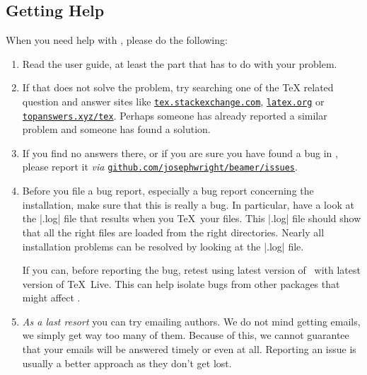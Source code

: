 \endgroup


\subsection{Getting Help}

When you need help with \beamer, please do the following:
\begin{enumerate}
\item
  Read the user guide, at least the part that has to do with your problem.
\item
  If that does not solve the problem, try searching one of the \TeX{} related question and answer sites like \href{https://tex.stackexchange.com}{\texttt{tex.stackexchange.com}}, \href{https://latex.org/forum/}{\texttt{latex.org}} or \href{https://topanswers.xyz/tex}{\texttt{topanswers.xyz/tex}}.
  Perhaps someone has already reported a similar problem and someone has found a solution.
\item
  If you find no answers there, or if you are sure you have found a bug in
  \beamer{}, please report it \emph{via} \href{https://github.com/josephwright/beamer/issues}{\texttt{github.com/josephwright/beamer/issues}}.
\item
  Before you file a bug report, especially a bug report concerning the installation, make sure that this is really a bug. In particular, have a look at the |.log| file that results when you \TeX\ your files. This |.log| file should show that all the right files are loaded from the right directories. Nearly all installation problems can be resolved by looking at the |.log| file.

  If you can, before reporting the bug, retest using latest version of \beamer\ with latest version of \TeX\ Live. This can help isolate bugs from other packages that might affect \beamer.
\item
  \emph{As a last resort} you can try emailing authors. We do not mind getting emails, we simply get way too many of them. Because of this, we cannot guarantee that your emails will be answered timely or even at all. Reporting
an issue is usually a better approach as they don't get lost.
\end{enumerate}
